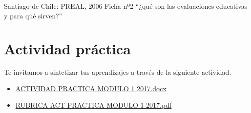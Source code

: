 \documentclass[12pt,letterpaper,article,x11names]{memoir}
\begin{document}
Santiago de Chile: PREAL, 2006 Ficha nº2 “¿qué son las evaluaciones educativas y para qué sirven?”

\section{Actividad práctica}
\label{sec:org0101e59}
Te invitamos a sintetizar tus aprendizajes a través de la siguiente actividad.

\begin{itemize}
\item \href{https://db.tt/k3LTxgylOW}{ACTIVIDAD PRACTICA MODULO 1 2017.docx}
\item \href{https://db.tt/sifGHXxD2u}{RUBRICA ACT PRACTICA MODULO 1 2017.pdf}
\end{itemize}
\end{document}
